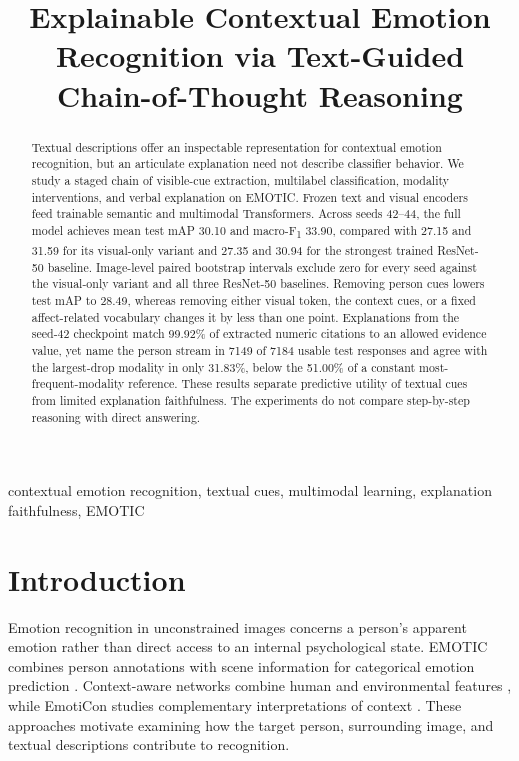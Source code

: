 \documentclass[conference]{IEEEtran}
\newcommand{\mf}{macro-F\textsubscript{1}}
\begin{document}
\title{Explainable Contextual Emotion Recognition via Text-Guided Chain-of-Thought Reasoning}
\author{
}
\maketitle

\begin{abstract}
Textual descriptions offer an inspectable representation for contextual emotion recognition, but an articulate explanation need not describe classifier behavior. We study a staged chain of visible-cue extraction, multilabel classification, modality interventions, and verbal explanation on EMOTIC. Frozen text and visual encoders feed trainable semantic and multimodal Transformers. Across seeds 42--44, the full model achieves mean test mAP 30.10 and \mf{} 33.90, compared with 27.15 and 31.59 for its visual-only variant and 27.35 and 30.94 for the strongest trained ResNet-50 baseline. Image-level paired bootstrap intervals exclude zero for every seed against the visual-only variant and all three ResNet-50 baselines. Removing person cues lowers test mAP to 28.49, whereas removing either visual token, the context cues, or a fixed affect-related vocabulary changes it by less than one point. Explanations from the seed-42 checkpoint match 99.92\% of extracted numeric citations to an allowed evidence value, yet name the person stream in 7149 of 7184 usable test responses and agree with the largest-drop modality in only 31.83\%, below the 51.00\% of a constant most-frequent-modality reference. These results separate predictive utility of textual cues from limited explanation faithfulness. The experiments do not compare step-by-step reasoning with direct answering.
\end{abstract}
\begin{IEEEkeywords}
contextual emotion recognition, textual cues, multimodal learning, explanation faithfulness, EMOTIC
\end{IEEEkeywords}

\section{Introduction}\label{sec:introduction}
Emotion recognition in unconstrained images concerns a person's apparent emotion rather than direct access to an internal psychological state. EMOTIC combines person annotations with scene information for categorical emotion prediction \cite{emotic}. Context-aware networks combine human and environmental features \cite{caer}, while EmotiCon studies complementary interpretations of context \cite{emoticon}. These approaches motivate examining how the target person, surrounding image, and textual descriptions contribute to recognition.
\end{document}
